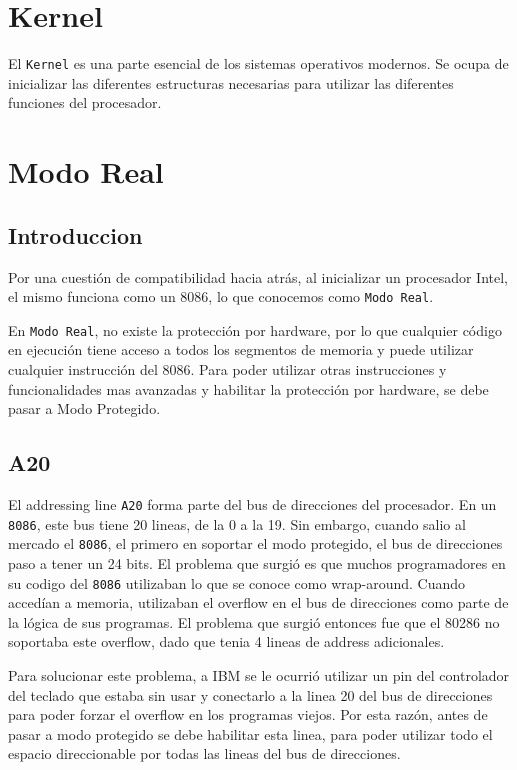 \section{Kernel}

El \texttt{Kernel} es una parte esencial de los sistemas operativos modernos. Se ocupa de inicializar las diferentes estructuras necesarias para utilizar las diferentes funciones del procesador.

\section{Modo Real}

\subsection{Introduccion}

Por una cuestión de compatibilidad hacia atrás, al inicializar un procesador Intel, el mismo funciona como un 8086, lo que conocemos como \texttt{Modo Real}. 

En \texttt{Modo Real}, no existe la protección por hardware, por lo que cualquier código en ejecución tiene acceso a todos los segmentos de memoria y puede utilizar cualquier instrucción del 8086. Para poder utilizar otras instrucciones y funcionalidades mas avanzadas y habilitar la protección por hardware, se debe pasar a Modo Protegido.

\subsection{A20}
El addressing line \texttt{A20} forma parte del bus de direcciones del procesador. En un \texttt{8086}, este bus tiene 20 lineas, de la 0 a la 19. Sin embargo, cuando salio al mercado el \texttt{8086}, el primero en soportar el modo protegido,  el bus de direcciones paso a tener un 24 bits. El problema que surgió es que muchos programadores en su codigo del \texttt{8086} utilizaban lo que se conoce como wrap-around. Cuando accedían a memoria, utilizaban el overflow en el bus de direcciones como parte de la lógica de sus programas. El problema que surgió entonces fue que el 80286 no soportaba este overflow, dado que tenia 4 lineas de address adicionales.

Para solucionar este problema, a IBM se le ocurrió utilizar un pin del controlador del teclado que estaba sin usar y conectarlo a la linea 20 del bus de direcciones para poder forzar el overflow en los programas viejos. Por esta razón, antes de pasar a modo protegido se debe habilitar esta linea, para poder utilizar todo el espacio direccionable por todas las lineas del bus de direcciones.


